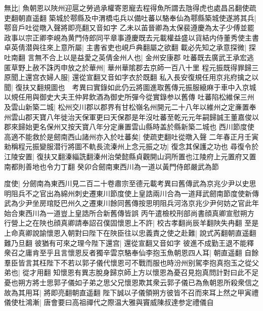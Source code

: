 無比|{
	魚朝恩以陜州迎扈之勞過承權寄恩寵去程得魚所謂去虺得虎也處昌呂翻使疏吏翻朝直遥翻}
築城於鄠縣及中渭橋屯兵以備吐蕃以駱奉仙為鄠縣築城使遂將其兵|{
	鄠音戶吐從暾入聲將即亮翻又音如字}
乙未以苖晉卿為太保裴遵慶為太子少傅並罷政事以宗正卿李峴為黄門侍郎同平章事遵慶既去元載權益盛以貨結内侍董秀使主書卓英倩潜與往來上意所屬|{
	主書省吏也峴戶典翻屬之欲翻}
載必先知之承意探微|{
	探吐南翻}
言無不合上以是益愛之英倩金州人也|{
	金州安康郡}
吐蕃既去廣武王承宏逃匿草野上赦不誅丙申放之於華州|{
	華州華隂郡去京師一百八十里}
程元振既得罪歸三原聞上還宫衣婦人服|{
	還從宣翻又音如字衣於既翻}
私入長安復規任用京兆府擒之以聞|{
	復扶又翻規圖也　考異曰實錄如此仍云將圖進取舊傳元振服縗麻于車中入京城以規任用與御史大夫王仲昇飲酒為御史所彈今從實錄参以舊傳}
吐蕃陷松維保三州及雲山新築二城|{
	松州交川郡以郡界有甘松嶺名州開元二十八年以維州之定亷置奉州雲山郡天寶八年徙治天保軍更曰天保郡是年沒吐蕃至乾元元年嗣歸誠王董嘉俊以郡來歸始更名保州又按天寶八年分定亷置雲山縣時盖於縣新築二城也}
西川節度使高適不能救於是劒南西山諸州亦入於吐蕃矣|{
	使疏吏翻吐從暾入聲}
二年春正月壬寅勑稱程元振變服潜行將圖不軌長流溱州上念元振之功|{
	復念其保護之功也}
尋復令於江陵安置|{
	復扶又翻溱緇詵翻溱州治榮懿縣貞觀開山洞所置也江陵府上元置府又置南都則善地也令力丁翻}
癸卯合劒南東西川為一道以黃門侍郎嚴武為節

度使|{
	分劒南為東西川見二百二十卷肅宗至德元載考異曰舊傳武為京兆少尹以史思明阻兵不之官出為綿州刺史遷東川節度使上皇誥兩川合為一道拜武劒南節度使新傳武為少尹坐房琯貶巴州久之遷東川餘同舊傳按思明阻兵河洛京兆少尹何妨之官此年始合東西川為一道豈上皇誥所合新舊傳皆誤}
丙午遣檢校刑部尚書顔真卿宣慰朔方行營上之在陜也顔真卿請奉詔召僕固懷恩上不許|{
	校古孝翻尚辰羊翻陜失冉翻}
至是上命真卿說諭懷恩入朝對曰陛下在陜臣往以忠義責之使之赴難|{
	說式芮翻朝直遥翻難乃旦翻}
彼猶有可來之理今陛下還宫|{
	還從宣翻又音如字}
彼進不成勤王退不能釋衆召之庸肯至乎且言懷恩反者獨辛雲京駱奉仙李抱玉魚朝恩四人耳|{
	朝直遥翻}
自餘羣臣皆言其枉陛下不若以郭子儀代懷恩可不戰而服也時汾州别駕李抱真抱玉之從父弟也|{
	從才用翻}
知懷恩有異志脫身歸京師上方以懷恩為憂召見抱真問計對曰此不足憂也朔方將士思郭子儀如子弟之思父兄懷恩欺其衆云郭子儀已為魚朝恩所殺衆信之故為其用耳|{
	將即亮翻朝直遥翻}
陛下誠以子儀領朔方彼皆不召而來耳上然之甲寅禮儀使杜鴻漸|{
	唐會要曰高祖禪代之際温大雅與竇威陳叔達参定禮儀自}


